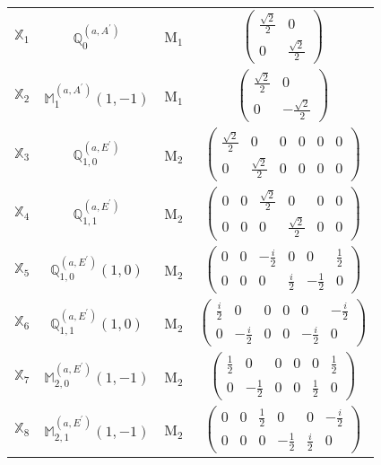 \documentclass[fleqn,10pt,landscape]{article}
\begin{document}
\begin{itemize}
\begin{center}
\begin{longtable}{c|c|c|c}
$ \mathbb{X}_{1} $ & $\mathbb{Q}_{0}^{(a,A^{\prime})}$ & M$_{1}$ & $\begin{pmatrix} \frac{\sqrt{2}}{2} & 0 \\ 0 & \frac{\sqrt{2}}{2} \end{pmatrix}$ \\
$ \mathbb{X}_{2} $ & $\mathbb{M}_{1}^{(a,A^{\prime})}(1,-1)$ & M$_{1}$ & $\begin{pmatrix} \frac{\sqrt{2}}{2} & 0 \\ 0 & - \frac{\sqrt{2}}{2} \end{pmatrix}$ \\ \hline
$ \mathbb{X}_{3} $ & $\mathbb{Q}_{1,0}^{(a,E^{\prime})}$ & M$_{2}$ & $\begin{pmatrix} \frac{\sqrt{2}}{2} & 0 & 0 & 0 & 0 & 0 \\ 0 & \frac{\sqrt{2}}{2} & 0 & 0 & 0 & 0 \end{pmatrix}$ \\
$ \mathbb{X}_{4} $ & $\mathbb{Q}_{1,1}^{(a,E^{\prime})}$ & M$_{2}$ & $\begin{pmatrix} 0 & 0 & \frac{\sqrt{2}}{2} & 0 & 0 & 0 \\ 0 & 0 & 0 & \frac{\sqrt{2}}{2} & 0 & 0 \end{pmatrix}$ \\
$ \mathbb{X}_{5} $ & $\mathbb{Q}_{1,0}^{(a,E^{\prime})}(1,0)$ & M$_{2}$ & $\begin{pmatrix} 0 & 0 & - \frac{i}{2} & 0 & 0 & \frac{1}{2} \\ 0 & 0 & 0 & \frac{i}{2} & - \frac{1}{2} & 0 \end{pmatrix}$ \\
$ \mathbb{X}_{6} $ & $\mathbb{Q}_{1,1}^{(a,E^{\prime})}(1,0)$ & M$_{2}$ & $\begin{pmatrix} \frac{i}{2} & 0 & 0 & 0 & 0 & - \frac{i}{2} \\ 0 & - \frac{i}{2} & 0 & 0 & - \frac{i}{2} & 0 \end{pmatrix}$ \\
$ \mathbb{X}_{7} $ & $\mathbb{M}_{2,0}^{(a,E^{\prime})}(1,-1)$ & M$_{2}$ & $\begin{pmatrix} \frac{1}{2} & 0 & 0 & 0 & 0 & \frac{1}{2} \\ 0 & - \frac{1}{2} & 0 & 0 & \frac{1}{2} & 0 \end{pmatrix}$ \\
$ \mathbb{X}_{8} $ & $\mathbb{M}_{2,1}^{(a,E^{\prime})}(1,-1)$ & M$_{2}$ & $\begin{pmatrix} 0 & 0 & \frac{1}{2} & 0 & 0 & - \frac{i}{2} \\ 0 & 0 & 0 & - \frac{1}{2} & \frac{i}{2} & 0 \end{pmatrix}$ \\ \hline

\end{longtable}
\end{center}
\end{itemize}
\end{document}
